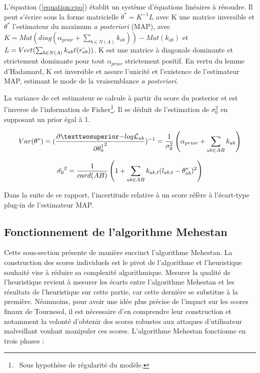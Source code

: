L'équation (\ref{equation:cpo}) établit un système d'équations linéaires à résoudre. Il peut s'écrire sous la forme matricielle $\theta^*=K^{-1}L$ avec K une matrice inversible et $\theta^*$ l'estimateur du maximum \textit{a posteriori} (MAP), avec $K = Mat(diag(\alpha_{prior}+\sum_{b \in N(A)} k_{ab}))   - Mat(k_{ab}) $
et $L = Vect(\sum_{b \in N(A)} k_{ab}\ell(\Tilde{r_{ab}}))$.
K est une matrice à diagonale dominante et strictement dominante pour tout $\alpha_{prior}$ strictement positif. En vertu du lemme d'Hadamard, K est inversible et assure l'unicité et l'existence de l'estimateur MAP, estimant le mode de la vraisemblance \textit{a posteriori}.

La variance de cet estimateur se calcule à partir du score du posterior et est l'inverse de l'information de Fisher\footnote{~Sous hypothèse de régularité du modèle.}. Il se déduit de l'estimation de $\sigma^2_0$ en supposant un prior égal à 1.

\begin{equation}
Var(\score)= (\frac{\partial²{-log \mathcal{L}_{ab}}}{\partial{\theta^\dagger_a}^2})^{-1}=\frac{1}{\sigma_0^2}\left( \alpha_{prior} + \sum_{ab \in AB} k_{ab} \right)
\end{equation}

\begin{equation}
\hat{\sigma_0}^2 =\frac{1}{card(AB)} \left( 1 + \sum_{ab \in AB} k_{ab,t}(l_{ab,t} - \theta^*_{ab})^2 \right)
\end{equation}

Dans la suite de ce rapport, l'incertitude relative à un score réfère à l'écart-type plug-in de l'estimateur MAP.

\subsection{Fonctionnement de l'algorithme Mehestan}

Cette sous-section présente de manière succinct l'algorithme Mehestan. La construction des scores individuels est le pivot de l'algorithme et l'heuristique souhaité vise à réduire sa complexité algorithmique. Mesurer la qualité de l'heuristique revient à mesurer les écarts entre l'algorithme Mehestan et les résultats de l'heuristique sur cette partie, car cette dernière se substitue à la première. Néanmoins, pour avoir une idée plus précise de l'impact sur les scores finaux de Tournesol, il est nécessaire d'en comprendre leur construction et notamment la volonté d'obtenir des scores robustes aux attaques d'utilisateur malveillant voulant manipuler ces scores.
L'algorithme Mehestan fonctionne en trois phases :

